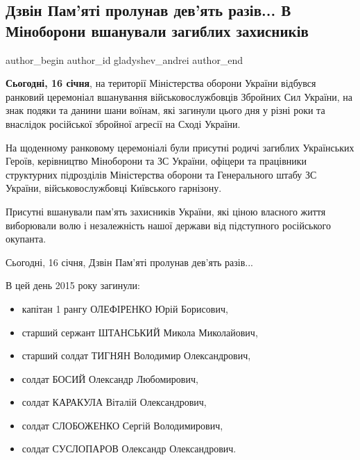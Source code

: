  
 
 
 
 
\subsection{Дзвін Пам’яті пролунав дев’ять разів... В Міноборони вшанували загиблих захисників}
\label{sec:16_01_2021.fb.gladyshev_andrei.3.zsu_memory_zahysnyky}
\ifcmt
  author_begin
   author_id gladyshev_andrei
  author_end
\fi

\textbf{Сьогодні, 16 січня}, на території Міністерства оборони України відбувся ранковий
церемоніал вшанування військовослужбовців Збройних Сил України, на знак подяки
та данини шани воїнам, які загинули цього дня у різні роки та внаслідок
російської збройної агресії на Сході України.

На щоденному ранковому церемоніалі були присутні родичі загиблих Українських
Героїв, керівництво Міноборони та ЗС України, офіцери та працівники структурних
підрозділів Міністерства оборони та Генерального штабу ЗС України,
військовослужбовці Київського гарнізону.

Присутні вшанували пам’ять захисників України, які ціною власного життя
виборювали волю і незалежність нашої держави від підступного російського
окупанта.

Сьогодні, 16 січня, Дзвін Пам’яті пролунав дев’ять разів...

В цей день 2015 року загинули:

\begin{itemize}
  \item капітан 1 рангу ОЛЕФІРЕНКО Юрій Борисович,
  \item старший сержант ШТАНСЬКИЙ Микола Миколайович,
  \item старший солдат ТИГНЯН Володимир Олександрович,
  \item солдат БОСИЙ Олександр Любомирович,
  \item солдат КАРАКУЛА Віталій Олександрович,
  \item солдат СЛОБОЖЕНКО Сергій Володимирович,
  \item солдат СУСЛОПАРОВ Олександр Олександрович.
\end{itemize}

